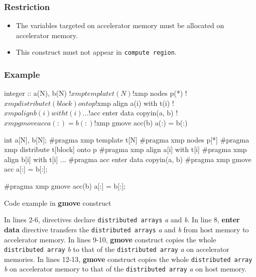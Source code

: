 \subsubsection*{Restriction}
\begin{itemize}
 \item The variables targeted on accelerator memory must be allocated on accelerator memory.
 \item This construct must not appear in {\OACC} {\tt compute region}.
\end{itemize}

\subsubsection*{Example}
\begin{myfigure}
\begin{minipage}{0.45\hsize}
\begin{center}
\begin{XACCFexampleL}
integer :: a(N), b(N)
!$xmp template t(N)
!$xmp nodes p(*)
!$xmp distribute t(block) onto p
!$xmp align a(i) with t(i)
!$xmp align b(i) with t(i)
...
!$acc enter data copyin(a, b)
!$xmp gmove acc
  a(:) = b(:)

!$xmp gmove acc(b)
  a(:) = b(:)
\end{XACCFexampleL}
\end{center}
\end{minipage}
%
\begin{minipage}{0.53\hsize}
\begin{center}
\begin{XACCCexampleR}
int a[N], b[N];
#pragma xmp template t[N]
#pragma xmp nodes p[*]
#pragma xmp distribute t[block] onto p
#pragma xmp align a[i] with t[i]
#pragma xmp align b[i] with t[i]
...
#pragma acc enter data copyin(a, b)
#pragma xmp gmove acc
  a[:] = b[:];

#pragma xmp gmove acc(b)
  a[:] = b[:];
\end{XACCCexampleR}
\end{center}
\end{minipage}
\caption{Code example in {\XACC} {\bf gmove} construct}\label{code:gmove}
\end{myfigure}

In lines 2-6,
{\XMP} directives declare {\tt distributed arrays} {\it a} and {\it b}.
In line 8,
{\OACC} {\bf enter data} directive transfers the {\tt distributed arrays} {\it a} and {\it b} from host memory to accelerator memory.
In lines 9-10,
{\XACC} {\bf gmove} construct copies the whole {\tt distributed array} {\it b} to
that of the {\tt distributed array} {\it a} on accelerator memories.
In lines 12-13,
{\XACC} {\bf gmove} construct copies the whole {\tt distributed array} {\it b} on accelerator memory to
that of the {\tt distributed array} {\it a} on host memory.

